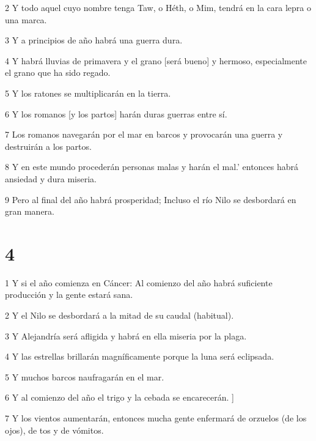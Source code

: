 \par 2 Y todo aquel cuyo nombre tenga Taw, o Héth, o Mim, tendrá en la cara lepra o una marca.

\par 3 Y a principios de año habrá una guerra dura.

\par 4 Y habrá lluvias de primavera y el grano [será bueno] y hermoso, especialmente el grano que ha sido regado.

\par 5 Y los ratones se multiplicarán en la tierra.

\par 6 Y los romanos [y los partos] harán duras guerras entre sí.

\par 7 Los romanos navegarán por el mar en barcos y provocarán una guerra y destruirán a los partos.

\par 8 Y en este mundo procederán personas malas y harán el mal.' entonces habrá ansiedad y dura miseria.

\par 9 Pero al final del año habrá prosperidad; Incluso el río Nilo se desbordará en gran manera.

\chapter{4}

\par 1 Y si el año comienza en Cáncer: Al comienzo del año habrá suficiente producción y la gente estará sana.

\par 2 Y el Nilo se desbordará a la mitad de su caudal (habitual).

\par 3 Y Alejandría será afligida y habrá en ella miseria por la plaga.

\par 4 Y las estrellas brillarán magníficamente porque la luna será eclipsada.

\par 5 Y muchos barcos naufragarán en el mar.

\par 6 Y al comienzo del año el trigo y la cebada se encarecerán. ]

\par 7 Y los vientos aumentarán, entonces mucha gente enfermará de orzuelos (de los ojos), de tos y de vómitos.

